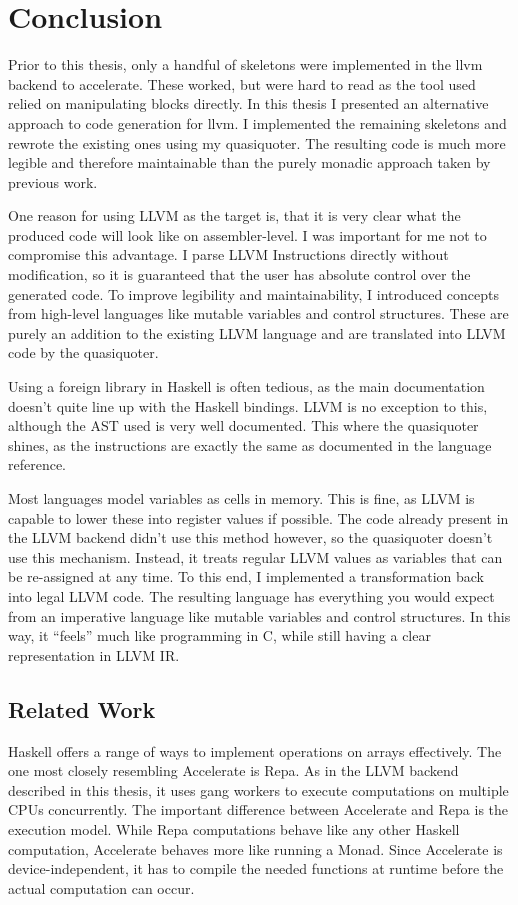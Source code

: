 \documentclass[a4paper,bibliography=totocnumbered,parskip,headsepline]{scrbook}
\begin{document}
\chapter{Conclusion}
Prior to this thesis, only a handful of skeletons were implemented in the llvm backend to accelerate.
These worked, but were hard to read as the tool used relied on manipulating blocks directly.
In this thesis I presented an alternative approach to code generation for llvm.
I implemented the remaining skeletons and rewrote the existing ones using my quasiquoter.
The resulting code is much more legible and therefore maintainable than the purely monadic approach taken by previous work.

One reason for using LLVM as the target is, that it is very clear what the produced code will look like on assembler-level.
I was important for me not to compromise this advantage.
I parse LLVM Instructions directly without modification, so it is guaranteed that the user has absolute control over the generated code.
To improve legibility and maintainability, I introduced concepts from high-level languages like mutable variables and control structures.
These are purely an addition to the existing LLVM language and are translated into LLVM code by the quasiquoter.

Using a foreign library in Haskell is often tedious, as the main documentation doesn't quite line up with the Haskell bindings.
LLVM is no exception to this, although the AST used is very well documented.
This where the quasiquoter shines, as the instructions are exactly the same as documented in the language reference.

Most languages model variables as cells in memory.
This is fine, as LLVM is capable to lower these into register values if possible.
The code already present in the LLVM backend didn't use this method however, so the quasiquoter doesn't use this mechanism.
Instead, it treats regular LLVM values as variables that can be re-assigned at any time.
To this end, I implemented a transformation back into legal LLVM code.
The resulting language has everything you would expect from an imperative language like mutable variables and control structures.
In this way, it ``feels'' much like programming in C, while still having a clear representation in LLVM IR.

\section{Related Work}
Haskell offers a range of ways to implement operations on arrays effectively.
The one most closely resembling Accelerate is Repa.
As in the LLVM backend described in this thesis, it uses gang workers to execute computations on multiple CPUs concurrently.
The important difference between Accelerate and Repa is the execution model.
While Repa computations behave like any other Haskell computation, Accelerate behaves more like running a Monad.
Since Accelerate is device-independent, it has to compile the needed functions at runtime before the actual computation can occur.
\end{document}
